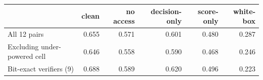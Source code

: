 \small
\begin{tabular*}{\textwidth}{@{\extracolsep{\fill}}lrrrrr@{}}
\toprule
 & clean & no access & decision-only & score-only & white-box \\
\midrule
All 12 pairs & 0.655 & 0.571 & 0.601 & 0.480 & 0.287 \\
Excluding under-powered cell & 0.646 & 0.558 & 0.590 & 0.468 & 0.246 \\
Bit-exact verifiers (9) & 0.688 & 0.589 & 0.620 & 0.496 & 0.223 \\
\bottomrule
\end{tabular*}

